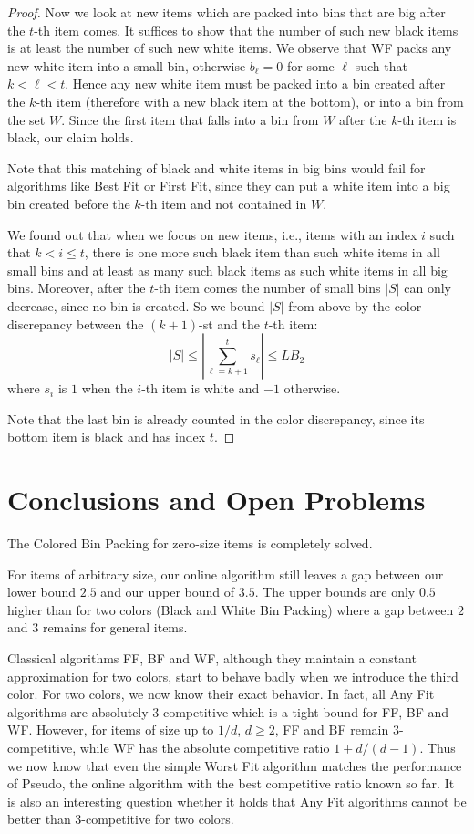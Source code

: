 \documentclass[11pt,a4paper]{article}
\def\vari#1{\mathit{#1}}
\begin{document}
\begin{proof}
Now we look at new items which are packed
into bins that are big after the $t$-th item comes.
It suffices to show that the number of such new black items is at least the number of such new white items.
We observe that WF packs any new white item into a small bin,
otherwise $b_\ell = 0$ for some $\ell$ such that $k < \ell < t$.
Hence any new white item must be packed into a bin created after the $k$-th item (therefore with a new black item at the bottom),
or into a bin from the set $W$.
Since the first item that falls into a bin from $W$ after the $k$-th item is black, our claim holds.

Note that this matching of black and white items in big bins would fail
for algorithms like Best Fit or First Fit, since they can put
a white item into a big bin created before the $k$-th item and not contained in $W$.

We found out that when we focus on new items, i.e., items with an index $i$ such that $k < i \leq t$,
there is one more such black item than such white items in all small bins
and at least as many such black items as such white items in all big bins.
Moreover, after the $t$-th item comes the number of small bins $|S|$ can only decrease,
since no bin is created.
So we bound $|S|$ from above by the color discrepancy
between the $(k + 1)$-st and the $t$-th item:
$$|S| \leq \left| \sum_{\ell=k + 1}^{t} s_\ell \right| \leq \vari{LB_2}$$
where $s_i$ is $1$ when the $i$-th item is white and $-1$ otherwise.

Note that the last bin is already counted in the color discrepancy,
since its bottom item is black and has index $t$.
\end{proof}

\section*{Conclusions and Open Problems}

The Colored Bin Packing for zero-size items is completely solved.

For items of arbitrary size, our online algorithm still leaves
a gap between our lower bound $2.5$ and our upper bound of $3.5$.
The upper bounds are only
$0.5$ higher than for two colors (Black and White Bin Packing) where a
gap between $2$ and $3$ remains for general items.

Classical algorithms FF, BF and WF, although they maintain a constant
approximation for two colors, start to behave badly when we introduce
the third color.  For two colors, we now know their exact behavior.
In fact, all Any Fit algorithms are absolutely
$3$-competitive which is a tight bound for FF, BF and WF. However, for
items of size up to $1/d$, $d \geq 2$, FF and BF remain
$3$-competitive, while WF has the absolute competitive ratio $1 + d/(d-1)$.
Thus we now know that
even the simple Worst Fit algorithm matches the
performance of Pseudo, the online algorithm with the best competitive
ratio known so far.
It is also an interesting question whether it
holds that Any Fit algorithms cannot be better than $3$-competitive
for two colors.
\end{document}

